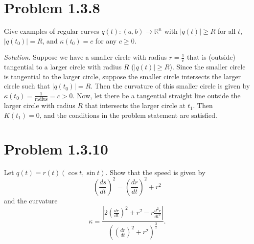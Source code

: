\documentclass[12pt]{article}
\newcommand{\RR}{\mathbb{R}}
\newcommand\abs[1]{\left| #1 \right|}
\newcommand\parens[1]{\left( #1 \right)}
\newcommand\sol[1]{\begin{mdframed}
\emph{Solution.} #1
\end{mdframed}}
\begin{document}
\section*{Problem 1.3.8}
Give examples of regular curves $q(t) : (a,b) \rightarrow \RR^n$ with $|q(t)| \geq R$ for all $t$, $|q(t_0)| = R$, and $\kappa(t_0) = c$ for any $c \geq 0$.

\sol{
    Suppose we have a smaller circle with radius $r = \frac{1}{c}$ that is (outside) tangential to a larger circle with radius $R$ ($\abs{q(t)} \geq R$). Since the smaller circle is tangential to the larger circle, suppose the smaller circle intersects the larger circle such that $\abs{q(t_0)} = R$. Then the curvature of this smaller circle is given by $\kappa\parens{t_0} = \frac{1}{\text{radius}} = c > 0$. Now, let there be a tangential straight line outside the larger circle with radius $R$ that intersects the larger circle at $t_1$. Then $K(t_1) = 0$, and the conditions in the problem statement are satisfied.
}

\section*{Problem 1.3.10}
Let $q(t) = r(t)(\cos t, \sin t)$. Show that the speed is given by 
\[\parens{\frac{ds}{dt}}^2 = \parens{\frac{dr}{dt}}^2 + r^2\]
and the curvature
\[\kappa = \frac{\abs{2\parens{\frac{dr}{dt}}^2 + r^2 - r \frac{d^2r}{dt^2}}}{\parens{\parens{\frac{dr}{dt}}^2 + r^2}^{\frac{3}{2}}}.\]
\end{document}
